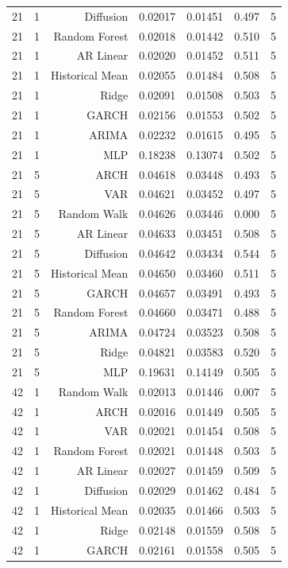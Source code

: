 \begin{table}[!htbp]
\begin{tabular}{lrrrrrr}
21 & 1 & Diffusion & 0.02017 & 0.01451 & 0.497 & 5 \\
21 & 1 & Random Forest & 0.02018 & 0.01442 & 0.510 & 5 \\
21 & 1 & AR Linear & 0.02020 & 0.01452 & 0.511 & 5 \\
21 & 1 & Historical Mean & 0.02055 & 0.01484 & 0.508 & 5 \\
21 & 1 & Ridge & 0.02091 & 0.01508 & 0.503 & 5 \\
21 & 1 & GARCH & 0.02156 & 0.01553 & 0.502 & 5 \\
21 & 1 & ARIMA & 0.02232 & 0.01615 & 0.495 & 5 \\
21 & 1 & MLP & 0.18238 & 0.13074 & 0.502 & 5 \\
21 & 5 & ARCH & 0.04618 & 0.03448 & 0.493 & 5 \\
21 & 5 & VAR & 0.04621 & 0.03452 & 0.497 & 5 \\
21 & 5 & Random Walk & 0.04626 & 0.03446 & 0.000 & 5 \\
21 & 5 & AR Linear & 0.04633 & 0.03451 & 0.508 & 5 \\
21 & 5 & Diffusion & 0.04642 & 0.03434 & 0.544 & 5 \\
21 & 5 & Historical Mean & 0.04650 & 0.03460 & 0.511 & 5 \\
21 & 5 & GARCH & 0.04657 & 0.03491 & 0.493 & 5 \\
21 & 5 & Random Forest & 0.04660 & 0.03471 & 0.488 & 5 \\
21 & 5 & ARIMA & 0.04724 & 0.03523 & 0.508 & 5 \\
21 & 5 & Ridge & 0.04821 & 0.03583 & 0.520 & 5 \\
21 & 5 & MLP & 0.19631 & 0.14149 & 0.505 & 5 \\
42 & 1 & Random Walk & 0.02013 & 0.01446 & 0.007 & 5 \\
42 & 1 & ARCH & 0.02016 & 0.01449 & 0.505 & 5 \\
42 & 1 & VAR & 0.02021 & 0.01454 & 0.508 & 5 \\
42 & 1 & Random Forest & 0.02021 & 0.01448 & 0.503 & 5 \\
42 & 1 & AR Linear & 0.02027 & 0.01459 & 0.509 & 5 \\
42 & 1 & Diffusion & 0.02029 & 0.01462 & 0.484 & 5 \\
42 & 1 & Historical Mean & 0.02035 & 0.01466 & 0.503 & 5 \\
42 & 1 & Ridge & 0.02148 & 0.01559 & 0.508 & 5 \\
42 & 1 & GARCH & 0.02161 & 0.01558 & 0.505 & 5 \\

\end{tabular}
\end{table}
